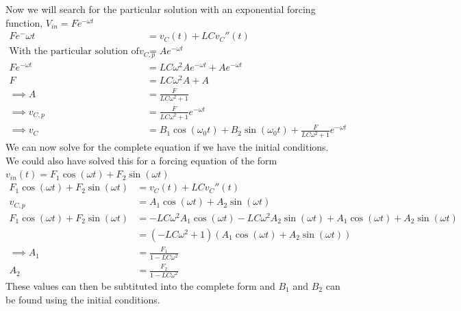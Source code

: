 \documentclass[nobib]{tufte-handout}
\begin{document}
Now we will search for the particular solution with an exponential forcing function, $V_{in} = Fe^{-\omega t}$
\begin{align*}
    Fe^-{\omega t}                                            & = v_C(t)+LCv_C''(t)                                                           \\
    \text{With the particular solution of the form }  v_{C,p} & = Ae^{-\omega t}                                                              \\
    Fe^{-\omega t}                                            & = LC\omega^2Ae^{-\omega t}+ Ae^{-\omega t}                                    \\
    F                                                         & = LC\omega^2A+A                                                               \\
    \implies A                                                & = \frac{F}{LC \omega^2+1}                                                     \\
    \implies v_{C,p}                                          & = \frac{F}{LC\omega^2+1}e^{-\omega t}                                         \\
    \implies v_C                                              & = B_1\cos(\omega_0t)+B_2\sin(\omega_0t) + \frac{F}{LC\omega^2+1}e^{-\omega t}
\end{align*}
We can now solve for the complete equation if we have the initial conditions.\\
We could also have solved this for a forcing equation of the form $v_{in}(t) = F_1\cos(\omega t)+F_2\sin(\omega t)$
\begin{align*}
    F_1\cos(\omega t)+F_2\sin(\omega t) & = v_C(t)+LCv_C''(t)                                                                                \\
    v_{C,p}                             & = A_1\cos(\omega t)+ A_2\sin(\omega t)                                                             \\
    F_1\cos(\omega t)+F_2\sin(\omega t) & = -LC\omega^2A_1\cos(\omega t)-LC\omega^2A_2\sin(\omega t) + A_1\cos(\omega t)+ A_2 \sin(\omega t) \\
                                        & = (-LC\omega^2+1)(A_1 \cos(\omega t)+A_2\sin(\omega t))                                            \\
    \implies A_1                        & = \frac{F_1}{1-LC\omega^2}                                                                         \\
    A_2                                 & = \frac{F_2}{1-LC\omega^2}
\end{align*}
These values can then be subtituted into the complete form and $B_1$ and $B_2$ can be found using the initial conditions.
\end{document}
